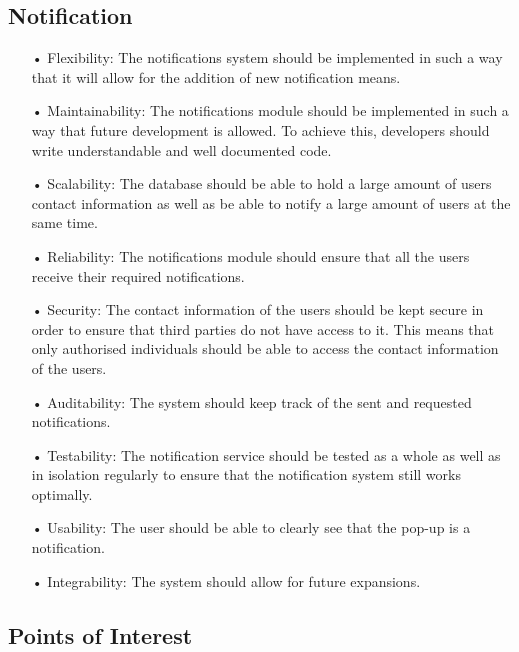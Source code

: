 \documentclass[runningheads,a4paper]{article}
\begin{document}
\subsection{Notification}
\begin{enumerate}

\item[•]Flexibility: The notifications system should be implemented in such a way that it will allow for the addition of new notification means.

\item[•]Maintainability: The notifications module should be implemented in such a way that future development is allowed. To achieve this, developers should write understandable and well documented code.
 
\item[•]Scalability: The database should be able to hold a large amount of users contact information as well as be able to notify a large amount of users at the same time.

\item[•]Reliability: The notifications module should ensure that all the users receive their required notifications.

\item[•]Security: The contact information of the users should be kept secure in order to ensure that third parties do not have access to it. This means that only authorised individuals should be able to access the contact information of the users.

\item[•]Auditability: The system should keep track of the sent and requested notifications.

\item[•]Testability: The notification service should be tested as a whole as well as in isolation regularly to ensure that the notification system still works optimally.

\item[•]Usability: The user should be able to clearly see that the pop-up is a notification.

\item[•]Integrability: The system should allow for future expansions.

\end{enumerate}
\subsection{Points of Interest}
\end{document}
